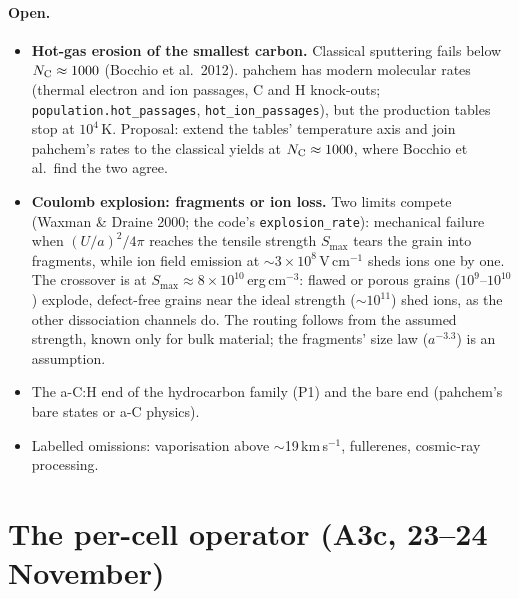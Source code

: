 \documentclass[11pt,a4paper]{article}
\newcommand{\NC}{N_{\rm C}}
\begin{document}
\paragraph{Open.}
\begin{itemize}
\item \textbf{Hot-gas erosion of the smallest carbon.} Classical sputtering fails below $\NC\approx1000$ (Bocchio et al.\
  2012). pahchem has modern molecular rates (thermal electron and ion passages, C and H knock-outs; \texttt{population.hot\_passages},
  \texttt{hot\_ion\_passages}), but the production tables stop at $10^4$\,K. Proposal: extend the tables' temperature axis
  and join pahchem's rates to the classical yields at $\NC\approx1000$, where Bocchio et al.\ find the two agree.
\item \textbf{Coulomb explosion: fragments or ion loss.} Two limits compete (Waxman \& Draine 2000; the code's
  \texttt{explosion\_rate}): mechanical failure when $(U/a)^2/4\pi$ reaches the tensile strength $S_{\max}$ tears the grain
  into fragments, while ion field emission at $\sim3\times10^8$\,V\,cm$^{-1}$ sheds ions one by one. The crossover is at
  $S_{\max}\approx8\times10^{10}$\,erg\,cm$^{-3}$: flawed or porous grains ($10^9$--$10^{10}$) explode, defect-free grains
  near the ideal strength ($\sim10^{11}$) shed ions, as the other dissociation channels do. The routing follows from the
  assumed strength, known only for bulk material; the fragments' size law ($a^{-3.3}$) is an assumption.
\item The a-C:H end of the hydrocarbon family (P1) and the bare end (pahchem's bare states or a-C physics).
\item Labelled omissions: vaporisation above $\sim$19\,km\,s$^{-1}$, fullerenes, cosmic-ray processing.
\end{itemize}

\section{The per-cell operator (A3c, 23--24 November)}\label{sec:a3c}
\end{document}
